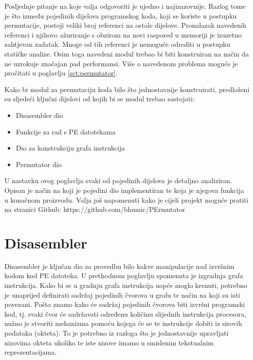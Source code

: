 \documentclass[times, utf8, diplomski, numeric]{fer}
\begin{document}
Posljednje pitanje na koje valja odgovoriti je ujedno i
najizazovnije. Razlog tome je što između pojedinih dijelova
programskog koda, koji se koriste u postupku permutacije, postoji
veliki broj referenci na ostale dijelove. Pronalazak navedenih
referenci i njihovo ažuriranje s obzirom na novi raspored u
memoriji je izuzetno zahtjevan zadatak. Mnoge od tih referenci je
nemoguće odrediti u postupku statičke analize. Osim toga navedeni
modul trebao bi biti konstruiran na način da ne uzrokuje značajan
pad performansi. Više o navedenom problema moguće je pročitati u
poglavlju \ref{sct:permutator}.

Kako bi modul za permutaciju koda bilo što jednostavnije
konstruirati, predloženi su sljedeći ključni dijelovi od kojih bi
se modul trebao sastojati:

\begin{itemize}
\item Disasembler dio
\item Funkcije za rad s PE datotekama
\item Dio za konstrukciju grafa instrukcija
\item Permutator dio
\end{itemize}

U nastavku ovog poglavlja svaki od pojedinih dijelova je detaljno
analiziran. Opisan je način na koji je pojedini dio implementiran
te koja je njegova funkcija u konačnom proizvodu. Valja još
napomenuti kako je cijeli projekt moguće pratiti na stranici
Github: https://github.com/bhumic/PErmutator					%


\section{Disasembler}

Disasembler je ključan dio za provedbu bilo kakve manipulacije
nad izvršnim kodom kod PE datoteka. U prethodnom poglavlju
spomenuta je izgradnja grafa instrukcija. Kako bi se u gradnju
grafa instrukcija uopće moglo krenuti, potrebno je unaprijed
definirati sadržaj pojedinih čvorova u grafu te način na koji su
isti povezani. Pošto znamo kako će sadržaj pojedinih čvorova biti
izvršni programski kod, tj. svaki čvor će sadržavati određenu
količinu slijednih instrukcija procesora, nužno je stvoriti
mehanizma pomoću kojega će se te instrukcije dobiti iz sirovih
podataka (okteta). To je potrebno iz razloga što je jednostavnije
upravljati nizovima okteta ukoliko te iste nizove imamo u
smislenim tekstualnim reprezentacijama.
\end{document}
